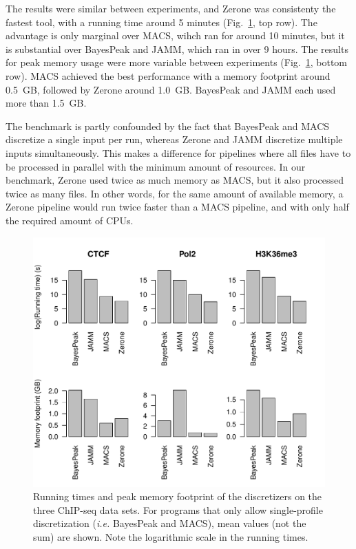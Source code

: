 \documentclass{bioinfo}
\begin{document}
The results were similar between experiments, and Zerone was
consistenty the fastest tool, with a running time around 5 minutes
(Fig.~\ref{fig:perf}, top row). The advantage is only marginal over
MACS, wihch ran for around 10 minutes, but it is substantial over
BayesPeak and JAMM, which ran in over 9 hours. The results for peak
memory usage were more variable between experiments (Fig.~\ref{fig:perf},
bottom row). MACS achieved the best performance with a memory
footprint around 0.5~GB, followed by Zerone around 1.0~GB.
BayesPeak and JAMM each used more than 1.5~GB.

The benchmark is partly confounded by the fact that BayesPeak and MACS
discretize a single input per run, whereas Zerone and JAMM discretize
multiple inputs simultaneously. This makes a difference for pipelines
where all files have to be processed in parallel with the minimum
amount of resources. In our benchmark, Zerone used twice as much memory
as MACS, but it also processed twice as many files. In other words, for
the same amount of available memory, a Zerone pipeline would run twice
faster than a MACS pipeline, and with only half the required amount of
CPUs.


\begin{figure}[!tpb]
\centerline{\includegraphics[scale=0.5]{performance.pdf}}
\caption{Running times and peak memory footprint of the
discretizers on the three ChIP-seq data sets. For programs that only
allow single-profile discretization (\textit{i.e.} BayesPeak and MACS),
mean values (not the sum) are shown. Note the logarithmic scale in the
running times.
}\label{fig:perf}
\end{figure}
\end{document}
